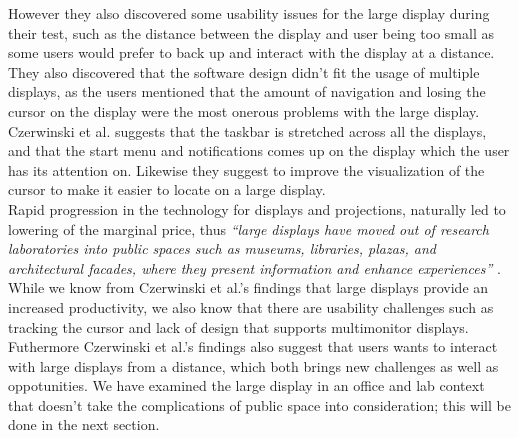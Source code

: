 However they also discovered some usability issues for the large display during their test, such as the distance between the display and user being too small as some users would prefer to back up and interact with the display at a distance. They also discovered that the software design didn't fit the usage of multiple displays, as the users mentioned that the amount of navigation and losing the cursor on the display were the most onerous problems with the large display.
Czerwinski et al. suggests that the taskbar is stretched across all the displays, and that the start menu and notifications comes up on the display which the user has its attention on. Likewise they suggest to improve the  visualization of the cursor to make it easier to locate on a large display.\cite{Czerwinski:2003}\\

Rapid progression in the technology for displays and projections, naturally led to lowering of the marginal price, thus \emph{``large displays have moved out of research laboratories into public spaces such as museums, libraries, plazas, and architectural facades, where they present information and enhance experiences''} \cite{Hinrichs:2013:IPD:2478559.2478965}.  %
While we know from Czerwinski et al.'s findings  that large displays provide an increased productivity, we also know that there are usability challenges such as tracking the cursor and lack of design that supports multimonitor displays. Futhermore Czerwinski et al.'s findings also suggest that users wants to interact with large displays from a distance, which both brings new challenges as well as oppotunities. We have examined the large display in an office and lab context that  doesn't take the complications of public space into consideration; this will be done in the next section.
